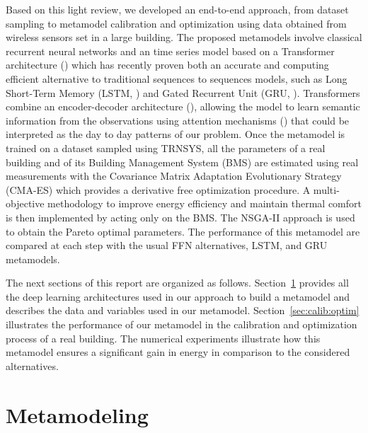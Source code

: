 \documentclass[12pt]{article}
\begin{document}
Based on this light review, we developed an end-to-end approach, from dataset sampling to metamodel calibration and optimization using data obtained from wireless sensors set in a large building. The proposed metamodels involve classical recurrent neural networks and an time series model based on a Transformer architecture (\cite{Vaswani2017AttentionIA}) which has recently proven both an accurate and computing efficient alternative to traditional sequences to sequences models, such as Long Short-Term Memory (LSTM, \cite{Hochreiter1997LongSM}) and Gated Recurrent Unit (GRU, \cite{Cho2014LearningPR}). Transformers combine an encoder-decoder architecture (\cite{Cho2014LearningPR, Bahdanau2014NeuralMT}), allowing the model to learn semantic information from the observations using attention mechanisms (\cite{Parikh2016ADA, Zhu2019AnES}) that could be interpreted as the day to day patterns of our problem. Once the metamodel is trained on a dataset sampled using TRNSYS, all the parameters of a real building and of its Building Management System (BMS) are estimated using real measurements with the Covariance Matrix Adaptation Evolutionary Strategy (CMA-ES) \cite{igel:hansen:roth:2007} which provides a derivative free optimization procedure. A multi-objective methodology to improve energy efficiency and maintain thermal comfort is then implemented by acting only on the BMS. The NSGA-II approach is used to obtain the Pareto optimal parameters. The performance of this metamodel  are compared at each step with the usual FFN alternatives, LSTM, and GRU  metamodels.

The next sections of this report are organized as follows. Section~\ref{sec:models} provides all the deep learning architectures used in our approach to build a metamodel and describes the data and variables used in our metamodel. Section~\ref{sec:calib:optim} illustrates the performance of our metamodel in the calibration and optimization process of a real building. The numerical experiments illustrate how this metamodel ensures a significant gain in energy in comparison to the considered alternatives.

\section{Metamodeling}
\label{sec:models}
\end{document}
